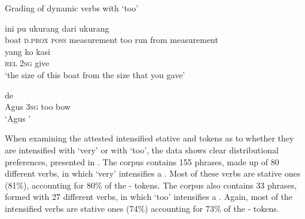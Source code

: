 \begin{styleExampleTitle}
Grading of  dynamic verbs with  ‘too’
\end{styleExampleTitle}

\ea
\label{Example_5.120}
 {{ini}} {pu} {ukurang} {} {} {dari} {ukurang}\\ %
 {boat}  {\textsc{d.prox}}  \textsc{poss}  measurement  too  run  from  measurement\\
\gll yang  {ko}  {kasi}\\
 \textsc{rel}  {\textsc{2sg}}  {give}\\
\glt 
‘the size of this boat  from the size that you gave’ \textstyleExampleSource{[Elicited BR130410.017]}
\z

\ea
\label{Example_5.121}
 {de} {} {}\\ %
 Agus  \textsc{3sg}  too  bow\\
\glt 
‘Agus ’ \textstyleExampleSource{[Elicited BR130410.004]}
\z


When examining the attested intensified  stative and   tokens as to whether they are intensified with  ‘very’ or with  ‘too’, the data shows clear distributional preferences, presented in . The corpus contains 155  phrases, made up of 80 different verbs, in which  ‘very’ intensifies a . Most of these verbs are stative ones (81\%), accounting for 80\% of the - tokens. The corpus also contains 33  phrases, formed with 27 different verbs, in which  ‘too’ intensifies a . Again, most of the intensified verbs are stative ones (74\%) accounting for 73\% of the - tokens.


